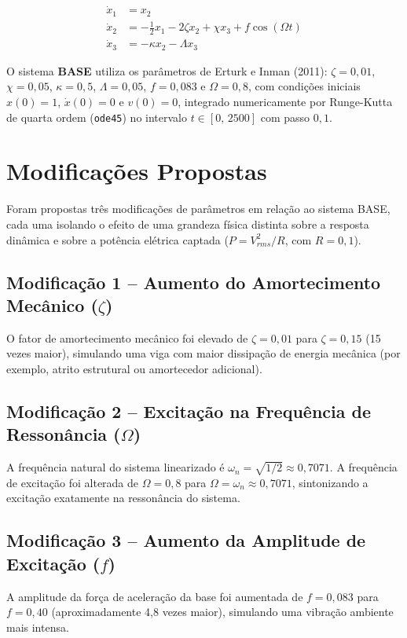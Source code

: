 \documentclass[a4paper,11pt]{article}
\begin{document}
\begin{align}
\dot{x}_1 &= x_2 \\
\dot{x}_2 &= -\frac{1}{2}x_1 - 2\zeta x_2 + \chi x_3 + f\cos(\Omega t) \\
\dot{x}_3 &= -\kappa x_2 - \Lambda x_3
\end{align}

O sistema \textbf{BASE} utiliza os parâmetros de Erturk e Inman (2011):
$\zeta=0{,}01$, $\chi=0{,}05$, $\kappa=0{,}5$, $\Lambda=0{,}05$,
$f=0{,}083$ e $\Omega=0{,}8$, com condições iniciais $x(0)=1$,
$\dot{x}(0)=0$ e $v(0)=0$, integrado numericamente por Runge-Kutta de
quarta ordem (\texttt{ode45}) no intervalo $t \in [0,\,2500]$ com passo
$0{,}1$.

\section{Modificações Propostas}

Foram propostas três modificações de parâmetros em relação ao sistema
BASE, cada uma isolando o efeito de uma grandeza física distinta sobre a
resposta dinâmica e sobre a potência elétrica captada
($P = V_{rms}^2/R$, com $R=0{,}1$).

\subsection{Modificação 1 -- Aumento do Amortecimento Mecânico ($\zeta$)}
O fator de amortecimento mecânico foi elevado de $\zeta=0{,}01$ para
$\zeta=0{,}15$ (15 vezes maior), simulando uma viga com maior dissipação
de energia mecânica (por exemplo, atrito estrutural ou amortecedor
adicional).

\subsection{Modificação 2 -- Excitação na Frequência de Ressonância ($\Omega$)}
A frequência natural do sistema linearizado é
$\omega_n=\sqrt{1/2}\approx 0{,}7071$. A frequência de excitação foi
alterada de $\Omega=0{,}8$ para $\Omega=\omega_n\approx0{,}7071$,
sintonizando a excitação exatamente na ressonância do sistema.

\subsection{Modificação 3 -- Aumento da Amplitude de Excitação ($f$)}
A amplitude da força de aceleração da base foi aumentada de $f=0{,}083$
para $f=0{,}40$ (aproximadamente 4,8 vezes maior), simulando uma
vibração ambiente mais intensa.
\end{document}
